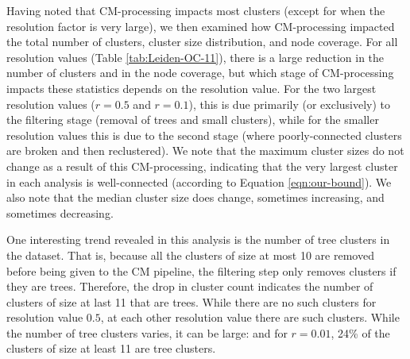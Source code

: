 \documentclass[11pt]{article}   	%
\begin{document}
Having noted that CM-processing impacts most clusters (except for when the resolution factor is very large), we then examined how CM-processing impacted the total number of clusters, cluster size distribution, and node coverage. 
For all resolution values (Table \ref{tab:Leiden-OC-11}), there is a large reduction in the number of clusters and in the node coverage, but which stage of CM-processing impacts these statistics depends on the resolution value.
For the  two largest resolution values ($r=0.5$ and $r=0.1$), this is
due primarily (or exclusively) to the filtering stage (removal of trees and small clusters), 
while  for the smaller resolution values this is due to the second stage (where poorly-connected clusters are broken and then reclustered).
We note that the maximum cluster sizes do not change as a result of this CM-processing, indicating that the very largest cluster in each analysis is well-connected (according to Equation \ref{eqn:our-bound}).
We also note that the median cluster size does change, sometimes increasing,  and sometimes decreasing.

One interesting trend revealed in this analysis is the number of tree clusters in the dataset. 
That is, because all the clusters of size at most 10 are removed before being given to the CM pipeline, the filtering
step only removes clusters if they are trees.
Therefore, the drop in cluster count indicates the number of clusters of size at last 11 that are trees.
While there are no such clusters for resolution value $0.5$, at each other resolution value there are such clusters.
While the number of tree clusters varies, it can be large: and for $r=0.01$, 24\% of the clusters of size at least 11 are tree clusters.
 
\end{document}
